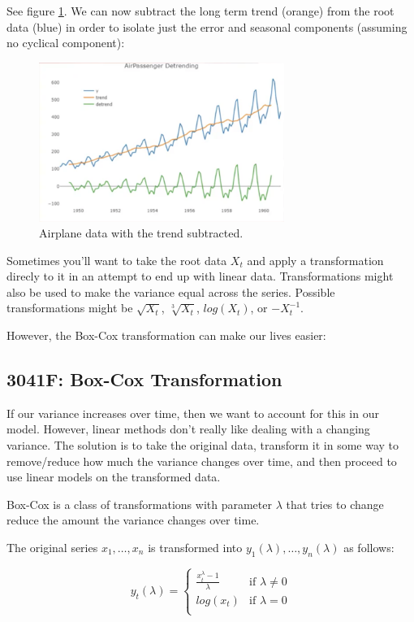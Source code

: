 \documentclass[12pt]{article}
\begin{document}
    See figure \ref{fig:airplane_data_less_trend}. 
    We can now subtract the long term trend (orange) from the root data (blue) 
    in order to isolate just the error and seasonal components (assuming no 
    cyclical component):
    \begin{figure}[t]
        \centering
        \includegraphics[width=8cm]{airplane_data_less_trend}
        \caption{Airplane data with the trend subtracted.}
        \label{fig:airplane_data_less_trend}
    \end{figure}

    Sometimes you'll want to take the root data $X_t$ and apply a transformation direcly to it
    in an attempt to end up with linear data. Transformations might also be used to make the variance equal across the series.
    Possible transformations might be $\sqrt{X_t}$, $\sqrt[3]{X_t}$, $log(X_t)$, or $-X_t^{-1}$.

    However, the Box-Cox transformation can make our lives easier:

    \subsection{3041F: Box-Cox Transformation}
        If our variance increases over time, then we want to account for this in our model. However, linear methods don't really like dealing with a changing variance. The solution is to take the original data, transform it in some way to remove/reduce how much the variance changes over time, and then proceed to use linear models on the transformed data.

        Box-Cox is a class of transformations with parameter $\lambda$  that tries to change reduce the amount the variance changes over time.

        The original series $x_1, \dots, x_n$ is transformed into $y_1(\lambda), \dots, y_n(\lambda)$ as follows:

        \begin{equation*}
            y_t(\lambda) =
            \begin{cases}
                \frac{x_t^{\lambda} - 1}{\lambda}  & \text{if $\lambda \ne 0$} \\[2ex]
                                        log(x_t) & \text{if $\lambda = 0$} \\
            \end{cases}
        \end{equation*}
\end{document}
